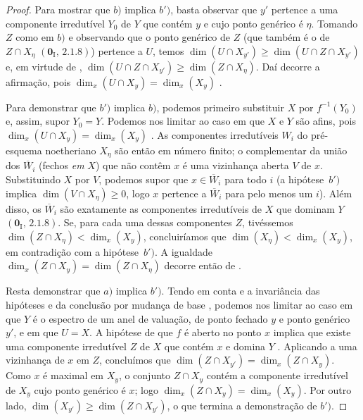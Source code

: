 \begin{proof}
Para mostrar que $b)$ implica $b')$, basta observar que $y'$ pertence a uma componente irredutível $Y_0$ de $Y$ que contém $y$ e cujo ponto genérico é $\eta$.
Tomando $Z$ como em $b)$ e observando que o ponto genérico de $Z$ (que também é o de $Z\cap X_\eta$ $(\mathbf{0}_{\mathrm I},\,2.1.8)$) pertence a $U$, temos $\dim(U\cap X_{y'})\geq\dim(U\cap Z\cap X_{y'})$ e, em virtude de , $\dim(U\cap Z\cap X_{y'})\geq\dim(Z\cap X_\eta)$.
Daí decorre a afirmação, pois $\dim_x(U\cap X_y)=\dim_x(X_y)$ .

Para demonstrar que $b')$ implica $b)$, podemos primeiro substituir $X$ por $f^{-1}(Y_0)$ e, assim, supor $Y_0=Y$.
Podemos nos limitar ao caso em que $X$ e $Y$ são afins, pois $\dim_x(U\cap X_y)=\dim_x(X_y)$ .
As componentes irredutíveis $W_i$ do pré-esquema noetheriano $X_\eta$ são então em número finito; o complementar da união dos $\overline{W}_i$ (fechos \emph{em} $X$) que não contêm $x$ é uma vizinhança aberta $V$ de $x$.
Substituindo $X$ por $V$, podemos supor que $x\in\overline{W}_i$ para todo $i$ (a hipótese~$b')$ implica $\dim(V\cap X_\eta)\geq 0$, logo $x$ pertence a $\overline{W}_i$ para pelo menos um $i$).
Além disso, os $\overline{W}_i$ são exatamente as componentes irredutíveis de $X$ que dominam $Y$ $(\mathbf{0}_{\mathrm I},\,2.1.8)$.
Se, para cada uma dessas componentes $Z$, tivéssemos $\dim(Z\cap X_\eta)<\dim_x(X_y)$, concluiríamos que $\dim(X_\eta)<\dim_x(X_y)$, em contradição com a hipótese~$b')$.
A igualdade $\dim_x(Z\cap X_y)=\dim(Z\cap X_\eta)$ decorre então de .

Resta demonstrar que $a)$ implica $b')$.
Tendo em conta  e a invariância das hipóteses e da conclusão por mudança de base , podemos nos limitar ao caso em que $Y$ é o espectro de um anel de valuação, de ponto fechado $y$ e ponto genérico $y'$, e em que $U=X$.
A hipótese de que $f$ é aberto no ponto $x$ implica que existe uma componente irredutível $Z$ de $X$ que contém $x$ e domina $Y$ .
Aplicando  a uma vizinhança de $x$ em $Z$, concluímos que $\dim(Z\cap X_{y'})=\dim_x(Z\cap X_y)$.
Como $x$ é maximal em $X_y$, o conjunto $Z\cap X_y$ contém a componente irredutível de $X_y$ cujo ponto genérico é $x$; logo $\dim_x(Z\cap X_y)=\dim_x(X_y)$.
Por outro lado, $\dim(X_{y'})\geq\dim(Z\cap X_{y'})$, o que termina a demonstração de $b')$.
\end{proof}

